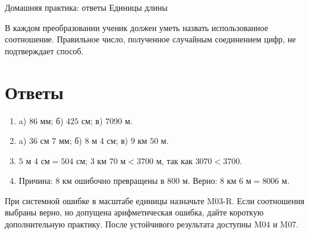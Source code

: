 \worksheettitle
  {Домашняя практика: ответы}
  { Единицы длины}

\begin{teacherbox}[Критерии]
  В каждом преобразовании ученик должен уметь назвать использованное
  соотношение. Правильное число, полученное случайным соединением цифр, не
  подтверждает способ.
\end{teacherbox}

\section{Ответы}

\begin{enumerate}
  \item a) $86$ мм; б) $425$ см; в) $7090$ м.
  \item a) $36\text{ см }7\text{ мм}$; б) $8\text{ м }4\text{ см}$;
    в) $9\text{ км }50\text{ м}$.
  \item $5\text{ м }4\text{ см}=504\text{ см}$;
    $3\text{ км }70\text{ м}<3700\text{ м}$, так как $3070<3700$.
  \item Причина: $8$ км ошибочно превращены в $800$ м. Верно:
    $8\text{ км }6\text{ м}=8006\text{ м}$.
\end{enumerate}

\begin{resultbox}[Маршрут]
  При системной ошибке в масштабе единицы назначьте M03-R. Если соотношения
  выбраны верно, но допущена арифметическая ошибка, дайте короткую
  дополнительную практику. После устойчивого результата доступны M04 и M07.
\end{resultbox}
